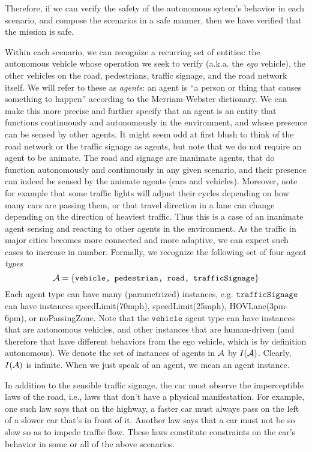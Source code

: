 Therefore, if we can verify the safety of the autonomous sytem's behavior in each scenario,
and compose the scenarios in a safe manner, 
then we have verified that the mission is safe.

Within each scenario, we can recognize a recurring set of entities: 
the autonomous vehicle whose operation we seek to verify (a.k.a. the \emph{ego} vehicle), the other vehicles on the road, pedestrians, traffic signage, and the road network itself. 
We will refer to these as \emph{agents}: an agent is ``a person or thing that causes something to happen'' according to the Merriam-Webster dictionary.
We can make this more precise and further specify that an agent is an entity that functions continuously and autonomously in the environment, and whose presence can be sensed by other agents. 
It might seem odd at first blush to think of the road network or the traffic signage as agents, but note that we do not require an agent to be animate.
The road and signage are inanimate agents, that do function autonomously and continuously in any given scenario, and their presence can indeed be sensed by the animate agents (cars and vehicles).
Moreover, note for example that some traffic lights will adjust their cycles depending on how many cars are passing them, or that travel direction in a lane can change depending on the direction of heaviest traffic.
Thus this is a case of an inanimate agent sensing and reacting to other agents in the environment.
As the traffic in major cities becomes more connected and more adaptive, we can expect such cases to increase in number. 
Formally, we recognize the following set of four agent \emph{types}
\[\mathcal{A} = \{\texttt{vehicle, pedestrian, road, trafficSignage}\}\]
Each agent type can have many (parametrized) instances, e.g. $\texttt{trafficSignage}$ can have instances speedLimit(70mph), speedLimit(25mph), HOVLane(3pm-6pm), or noPassingZone.
Note that the $\texttt{vehicle}$ agent type can have instances that are autonomous vehicles, and other instances that are human-driven (and therefore that have different behaviors from the ego vehicle, which is by definition autonomous). 
We denote the set of instances of agents in $\mathcal{A}$ by $I(\mathcal{A})$.
Clearly, $I(\mathcal{A})$ is infinite.
When we just speak of an agent, we mean an agent instance.

In addition to the sensible traffic signage, the car must observe the imperceptible laws of the road, i.e., laws that don't have a physical manifestation. 
For example, one such law says that on the highway, a faster car must always pass on the left of a slower car that's in front of it.
Another law says that a car must not be so slow so as to impede traffic flow. 
These laws constitute constraints on the car's behavior in some or all of the above scenarios.

